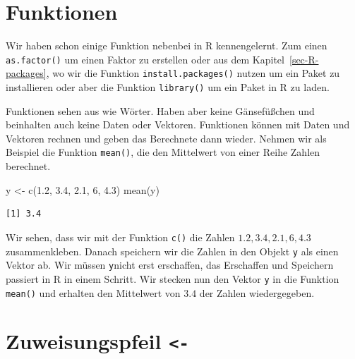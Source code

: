 \documentclass[
  letterpaper,
  DIV=11,
  oneside]{scrreport}
\newenvironment{Shaded}{\begin{snugshade}}{\end{snugshade}}
\newcommand{\DecValTok}[1]{\textcolor[rgb]{0.68,0.00,0.00}{#1}}
\newcommand{\FloatTok}[1]{\textcolor[rgb]{0.68,0.00,0.00}{#1}}
\newcommand{\FunctionTok}[1]{\textcolor[rgb]{0.28,0.35,0.67}{#1}}
\newcommand{\NormalTok}[1]{\textcolor[rgb]{0.00,0.23,0.31}{#1}}
\newcommand{\OtherTok}[1]{\textcolor[rgb]{0.00,0.23,0.31}{#1}}
\begin{document}
\hypertarget{sec-R-function}{%
\section{Funktionen}\label{sec-R-function}}

Wir haben schon einige Funktion nebenbei in R kennengelernt. Zum einen
\texttt{as.factor()} um einen Faktor zu erstellen oder aus dem
Kapitel~\ref{sec-R-packages}, wo wir die Funktion
\texttt{install.packages()} nutzen um ein Paket zu installieren oder
aber die Funktion \texttt{library()} um ein Paket in R zu laden.

Funktionen sehen aus wie Wörter. Haben aber keine Gänsefüßchen und
beinhalten auch keine Daten oder Vektoren. Funktionen können mit Daten
und Vektoren rechnen und geben das Berechnete dann wieder. Nehmen wir
als Beispiel die Funktion \texttt{mean()}, die den Mittelwert von einer
Reihe Zahlen berechnet.

\begin{Shaded}
\begin{Highlighting}[]
\NormalTok{y }\OtherTok{\textless{}{-}} \FunctionTok{c}\NormalTok{(}\FloatTok{1.2}\NormalTok{, }\FloatTok{3.4}\NormalTok{, }\FloatTok{2.1}\NormalTok{, }\DecValTok{6}\NormalTok{, }\FloatTok{4.3}\NormalTok{)}
\FunctionTok{mean}\NormalTok{(y)}
\end{Highlighting}
\end{Shaded}

\begin{verbatim}
[1] 3.4
\end{verbatim}

Wir sehen, dass wir mit der Funktion \texttt{c()} die Zahlen
\(1.2, 3.4, 2.1, 6, 4.3\) zusammenkleben. Danach speichern wir die
Zahlen in den Objekt \texttt{y} als einen Vektor ab. Wir müssen
\texttt{y}nicht erst erschaffen, das Erschaffen und Speichern passiert
in R in einem Schritt. Wir stecken nun den Vektor \texttt{y} in die
Funktion \texttt{mean()} und erhalten den Mittelwert von \(3.4\) der
Zahlen wiedergegeben.

{}

\hypertarget{sec-R-pfeil}{%
\section{\texorpdfstring{Zuweisungspfeil
\texttt{\textless{}-}}{Zuweisungspfeil \textless-}}\label{sec-R-pfeil}}
\end{document}
